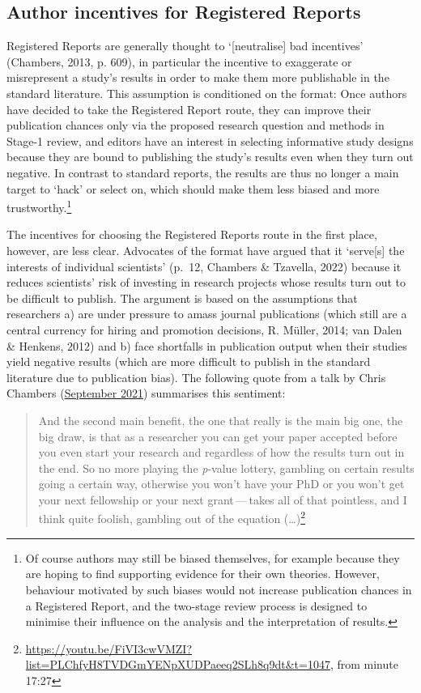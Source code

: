 \documentclass[
  british,
  a4paper,
  ,man,mask,floatsintext]{apa6}
\begin{document}
\subsection{Author incentives for Registered Reports}\label{author-incentives-for-registered-reports}

Registered Reports are generally thought to `{[}neutralise{]} bad incentives' (Chambers, 2013, p. 609), in particular the incentive to exaggerate or misrepresent a study's results in order to make them more publishable in the standard literature.
This assumption is conditioned on the format:
Once authors have decided to take the Registered Report route, they can improve their publication chances only via the proposed research question and methods in Stage-1 review, and editors have an interest in selecting informative study designs because they are bound to publishing the study's results even when they turn out negative.
In contrast to standard reports, the results are thus no longer a main target to `hack' or select on, which should make them less biased and more trustworthy.\footnote{Of course authors may still be biased themselves, for example because they are hoping to find supporting evidence for their own theories. However, behaviour motivated by such biases would not increase publication chances in a Registered Report, and the two-stage review process is designed to minimise their influence on the analysis and the interpretation of results.}

The incentives for choosing the Registered Reports route in the first place, however, are less clear.
Advocates of the format have argued that it `serve{[}s{]} the interests of individual scientists' (p.~12, Chambers \& Tzavella, 2022) because it reduces scientists' risk of investing in research projects whose results turn out to be difficult to publish.
The argument is based on the assumptions that researchers a) are under pressure to amass journal publications (which still are a central currency for hiring and promotion decisions, R. Müller, 2014; van Dalen \& Henkens, 2012) and b) face shortfalls in publication output when their studies yield negative results (which are more difficult to publish in the standard literature due to publication bias).
The following quote from a talk by Chris Chambers (\href{https://youtu.be/FiVI3cwVMZI?list=PLChfyH8TVDGmYENpXUDPaeeq2SLh8q9dt&t=1047}{September 2021}) summarises this sentiment:

\begin{quote}
And the second main benefit, the one that really is the main big one, the big draw, is that as a researcher you can get your paper accepted before you even start your research and regardless of how the results turn out in the end. So no more playing the \emph{p}-value lottery, gambling on certain results going a certain way, otherwise you won't have your PhD or you won't get your next fellowship or your next grant\(\,\)---\(\,\)takes all of that pointless, and I think quite foolish, gambling out of the equation (\ldots)\footnote{\url{https://youtu.be/FiVI3cwVMZI?list=PLChfyH8TVDGmYENpXUDPaeeq2SLh8q9dt&t=1047}, from minute 17:27}
\end{quote}
\end{document}
